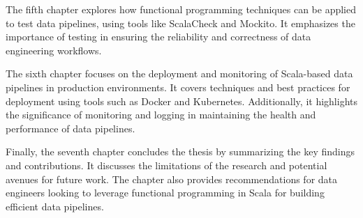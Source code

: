 The fifth chapter explores how functional programming techniques can be applied to test data pipelines, using tools like ScalaCheck and Mockito. It emphasizes the importance of testing in ensuring the reliability and correctness of data engineering workflows.

The sixth chapter focuses on the deployment and monitoring of Scala-based data pipelines in production environments. It covers techniques and best practices for deployment using tools such as Docker and Kubernetes. Additionally, it highlights the significance of monitoring and logging in maintaining the health and performance of data pipelines.

Finally, the seventh chapter concludes the thesis by summarizing the key findings and contributions. It discusses the limitations of the research and potential avenues for future work. The chapter also provides recommendations for data engineers looking to leverage functional programming in Scala for building efficient data pipelines.